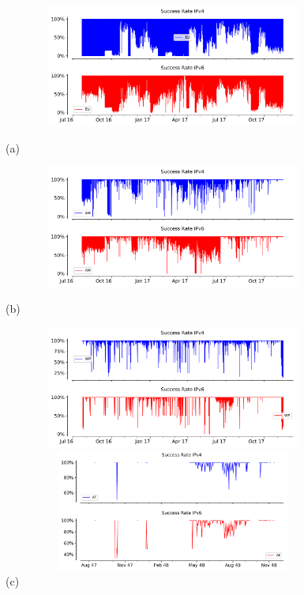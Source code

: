 \begin{figure}[!ht]
	\begin{minipage}{0.5\textwidth}
		\centering
		\includegraphics[keepaspectratio, height=4cm, width=15cm]{figures/success/netflix-success-rate-timeseries-region-eu.pdf}
		\caption[Time series of success rate over IPv4 and IPv6 for European Region]{(a)}
	\end{minipage}
	\begin{minipage}{0.5\textwidth}
		\centering
		\includegraphics[keepaspectratio, height=4cm, width=15cm]{figures/success/netflix-success-rate-timeseries-region-am.pdf}
		\caption[Time series of success rate over IPv4 and IPv6 for Region of Americas]{(b)}
	\end{minipage}
	\begin{minipage}{0.5\textwidth}
		\centering
		\includegraphics[keepaspectratio, height=4cm, width=15cm]{figures/success/netflix-success-rate-timeseries-region-wp.pdf}
		\caption[Time series of success rate over IPv4 and IPv6 for Western Pacific Region]{(c)}
	\end{minipage}
	\begin{minipage}{0.5\textwidth}
		\centering
		\includegraphics[keepaspectratio, height=4cm, width=15cm]{figures/success/netflix-success-rate-timeseries-region-af.pdf}

\end{minipage}
\end{figure}
